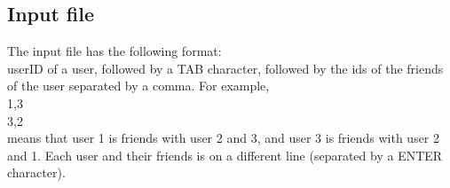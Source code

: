 \documentclass[11pt]{article}
\title{}
\author{}
\date{}
\begin{document}
\maketitle
\begin{justifying}
\section{Input file}
The input file has the following format:\\
userID of a user, followed by a TAB character, followed by the ids of the friends of the user separated by a comma. For example,\\
1\space\space{},3\\
3\space\space{},2\\
means that user 1 is friends with user 2 and 3, and user 3 is friends with user 2 and 1. Each user and their friends is on a different line (separated by a ENTER character).


\end{justifying}
\end{document}
